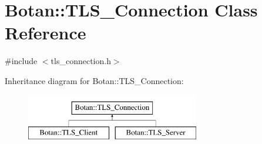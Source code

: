 \hypertarget{classBotan_1_1TLS__Connection}{\section{Botan\-:\-:T\-L\-S\-\_\-\-Connection Class Reference}
\label{classBotan_1_1TLS__Connection}
}


{\ttfamily \#include $<$tls\-\_\-connection.\-h$>$}

Inheritance diagram for Botan\-:\-:T\-L\-S\-\_\-\-Connection\-:\begin{figure}[H]
\begin{center}
\leavevmode
\includegraphics[height=2.000000cm]{classBotan_1_1TLS__Connection}
\end{center}
\end{figure}

